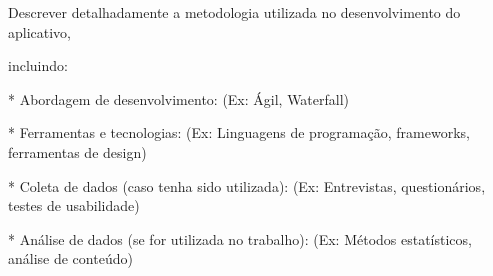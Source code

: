 Descrever detalhadamente a metodologia utilizada no desenvolvimento do aplicativo,

incluindo:

* Abordagem de desenvolvimento: (Ex: Ágil, Waterfall)

* Ferramentas e tecnologias: (Ex: Linguagens de programação, frameworks, ferramentas de design)

* Coleta de dados (caso tenha sido utilizada): (Ex: Entrevistas, questionários, testes de usabilidade)

* Análise de dados (se for utilizada no trabalho): (Ex: Métodos estatísticos, análise de conteúdo)
